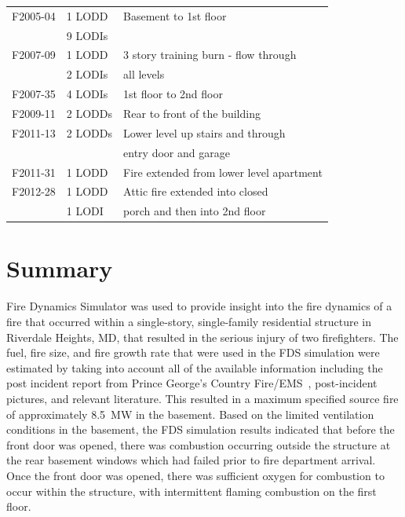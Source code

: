 \documentclass[12pt,oneside]{book}
\begin{document}
\begin{table}[!ht]
\begin{tabular}{lll}
F2005-04 \cite{NIOSH:McFall4}       &  1 LODD             &  Basement to 1st floor                     \\
                                    &  9 LODIs            &                                            \\
F2007-09 \cite{NIOSH:Tarley}        &  1 LODD             &  3 story training burn - flow through      \\
                                    &  2 LODIs            &  all levels                                \\
F2007-35 \cite{NIOSH:Braddee}       &  4 LODIs            &  1st floor to 2nd floor                    \\
F2009-11 \cite{NIOSH:Merinar}       &  2 LODDs            &  Rear to front of the building             \\
F2011-13 \cite{NIOSH:Bowyer2}       &  2 LODDs            &  Lower level up stairs and through         \\
                                    &                     &  entry door and garage                     \\
F2011-31 \cite{NIOSH:Loflin}        &  1 LODD             &  Fire extended from lower level apartment  \\
F2012-28 \cite{NIOSH:Bowyer}        &  1 LODD             &  Attic fire extended into closed           \\
                                    &  1 LODI             &  porch and then into 2nd floor             \\
\bottomrule
\end{tabular}
\label{tab:LODD}
\end{table}

\clearpage

\chapter{Summary}
Fire Dynamics Simulator was used to provide insight into the fire dynamics of a fire that occurred within a single-story, single-family residential structure in Riverdale Heights, MD, that resulted in the serious injury of two firefighters. The fuel, fire size, and fire growth rate that were used in the FDS simulation were estimated by taking into account all of the available information including the post incident report from Prince George's Country Fire/EMS~\cite{PGCounty2013}, post-incident pictures, and relevant literature. This resulted in a maximum specified source fire of approximately 8.5~MW in the basement. Based on the limited ventilation conditions in the basement, the FDS simulation results indicated that before the front door was opened, there was combustion occurring outside the structure at the rear basement windows which had failed prior to fire department arrival. Once the front door was opened, there was sufficient oxygen for combustion to occur within the structure, with intermittent flaming combustion on the first floor.
\end{document}
